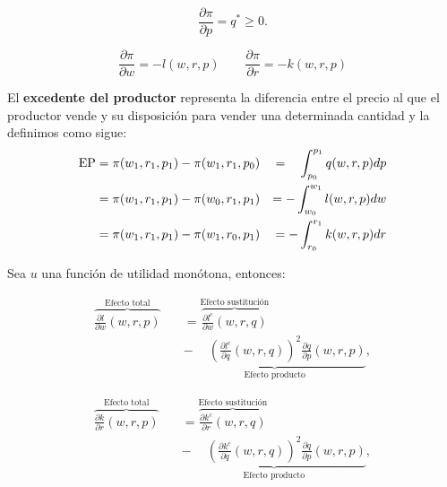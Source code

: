 \documentclass[8pt,a4paper]{extarticle}
\begin{document}
\begin{multicols}{3}
\begin{boxlemma}
	\[
	\frac{\partial \pi}{\partial p} = q^* \ge 0
	.\] 
\end{boxlemma}

\begin{boxcor}
	\[
		\frac{\partial \pi}{\partial w} = - l (w, r, p) \qquad \frac{\partial \pi}{\partial r} = - k (w, r, p)
\]
\end{boxcor}

\begin{boxdef}
	El \textbf{excedente del productor} representa la diferencia entre el precio al que el productor vende y su disposición para vender una determinada cantidad y la definimos como sigue:
\begin{equation*}
	\begin{aligned}
		\text{\normalfont EP} &= \pi(w_1, r_1, p_1) - \pi(w_1, r_1, p_0) &= \phantom{-} \int_{p_0}^{p_1} q(w,r,p)dp \\
							  &= \pi(w_1, r_1, p_1) - \pi(w_0, r_1, p_1) &= - \int_{w_0}^{w_1} l(w,r,p)dw \\
							  &= \pi(w_1, r_1, p_1) - \pi(w_1, r_0, p_1) &= - \int_{r_0}^{r_1} k(w,r,p)dr
	\end{aligned}
\end{equation*}
\end{boxdef}

\newpage

\sectionbreak

\begin{boxtheo}
	Sea $u$ una función de utilidad monótona, entonces:
	
	\begin{equation*}
	\begin{aligned}
		\overbrace{\frac{\partial l}{\partial w} (w, r, p)}^{\text{Efecto total}} \quad &= \overbrace{\frac{\partial l^c}{\partial w} (w, r, q)}^{\text{Efecto sustitución}} \\
																						& \underbrace{ - \quad\ \left( \frac{\partial l^c}{\partial q} (w,r,q) \right)^2 \frac{\partial q}{\partial p} (w, r, p)}_{\text{Efecto producto}},
	\end{aligned}
	\end{equation*}	

	\begin{equation*}
	\begin{aligned}
		\overbrace{\frac{\partial k}{\partial r} (w, r, p)}^{\text{Efecto total}} \quad &= \overbrace{\frac{\partial k^c}{\partial r} (w, r, q)}^{\text{Efecto sustitución}} \\
																						& \underbrace{ - \quad\ \left( \frac{\partial k^c}{\partial q} (w,r,q) \right)^2 \frac{\partial q}{\partial p} (w, r, p)}_{\text{Efecto producto}},
	\end{aligned}
	\end{equation*}	
	

\end{boxtheo}
\end{multicols}
\end{document}
